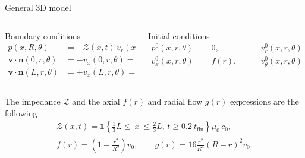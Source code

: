\documentclass[aspectratio=169]{ISAE-Beamer}
\begin{document}
\begin{frame}{General 3D model}
\begin{overlayarea}{\textwidth}{\textheight}
{\begin{columns}[T]
\begin{column}{.45\textwidth}
				Boundary conditions
				\begin{align*}
				p(x, R, \theta) &= - \mathcal{Z}(x, t) \, v_r(x, R, \theta), \\
				\bm{v} \cdot \bm{n}(0, r, \theta) &= -v_x(0, r, \theta) = - f(r), \\
				\bm{v} \cdot \bm{n}(L, r, \theta) &= +v_x(L, r, \theta) = + f(r), 
				\end{align*}
			\end{column}
			\begin{column}{.45\textwidth}
				Initial conditions
				\begin{equation*}
				\begin{aligned}
				p^0(x, r, \theta) &= 0, \\
				v_x^0(x, r, \theta) &= f(r), 
				\end{aligned}  \qquad
				\begin{aligned}
				v_r^0(x, r, \theta) &= g(r), \\
				v_\theta^0(x, r, \theta) &= 0.
				\end{aligned}    
				\end{equation*}
			\end{column}
		\end{columns}
		\vspace{5pt}
		The impedance $\mathcal{Z}$ and the axial $f(r)$ and radial flow $g(r)$ expressions are the following
		\begin{equation*}
		\begin{aligned}
		\mathcal{Z}(x, t) = \mathds{1}\left\{ \frac{1}{3} L \leq \ x \ \leq \frac{2}{3} L, \,  t \geq 0.2 \ t_{\text{fin}} \right\} \mu_0 \, c_0, \\
		f(r) = \left( 1 - \frac{r^2}{R^2} \right) v_0, \qquad
		g(r) = 16 \frac{r^2}{R^4} \left( R - r \right)^2 v_0. 
		\end{aligned}
		\end{equation*}
	}
\end{overlayarea}
\end{frame}
\end{document}
